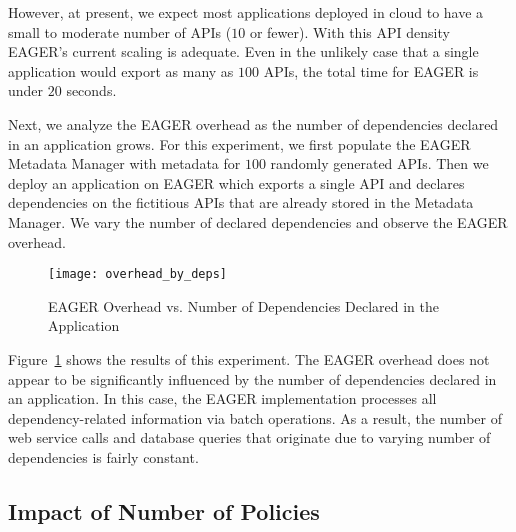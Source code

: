 However, at present, we expect 
most applications deployed in cloud to have a small to moderate number of 
APIs ($10$ or fewer).  With this API density EAGER's current scaling is
adequate.
Even in the
unlikely case that a single application would export as many as $100$ APIs,
the total time for EAGER is under $20$ seconds.


Next, we analyze the EAGER overhead as the number of dependencies declared in
an application grows. For this experiment, we first populate the EAGER
Metadata Manager with metadata for $100$ randomly generated APIs. Then we
deploy an application on EAGER which exports a single API and declares
dependencies on the fictitious 
APIs that are already stored in the Metadata Manager. We
vary the number of declared dependencies and observe the EAGER overhead.

\begin{figure}
\centering
\texttt{[image: overhead\_by\_deps]}
\vspace{-0.01in}
\caption{EAGER Overhead vs. Number of Dependencies Declared in the Application}
\label{fig:overhead_by_deps}
\end{figure}

Figure~\ref{fig:overhead_by_deps} shows the results of this experiment. 
The EAGER overhead does not appear to be significantly
influenced by the number of dependencies declared in an application. 
In this case, the EAGER implementation processes
all dependency-related information via batch operations. 
As a result, the number of web service calls and database queries that originate due to varying number of dependencies
is fairly constant. 

\subsection{Impact of Number of Policies}

